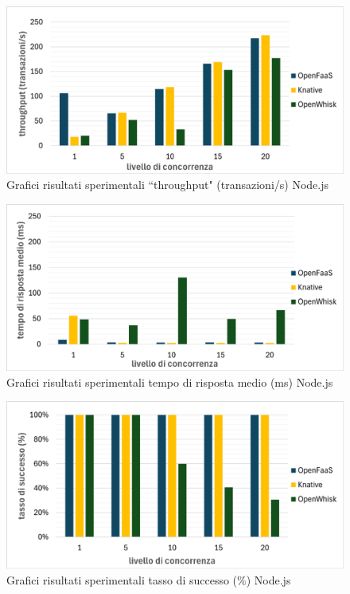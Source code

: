 \documentclass[12pt,a4paper,openany,twoside]{book}
\begin{document}
\begin{figure}[h!]
    \centering
    \includegraphics[width=\linewidth]{figures/graphs/throughput_node.pdf}
    \caption{Grafici risultati sperimentali ``throughput" (transazioni/s) Node.js}
    \label{fig:grafici-throughput-node}
\end{figure}

\begin{figure}[h!]
    \centering
    \includegraphics[width=\linewidth]{figures/graphs/tempoRisposta_node.pdf}
    \caption{Grafici risultati sperimentali tempo di risposta medio (ms) Node.js}
    \label{fig:grafici-tempo-risposta-node}
\end{figure}

\begin{figure}[h!]
    \centering
    \includegraphics[width=\linewidth]{figures/graphs/tassoSuccesso_node.pdf}
    \caption{Grafici risultati sperimentali tasso di successo (\%) Node.js}
    \label{fig:grafici-tasso-successo-node}
\end{figure}
\end{document}
